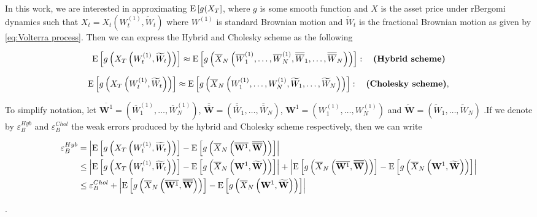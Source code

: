 In this work, we are interested in approximating $\mathrm{E}\left[g(X_T\right]$, where $g$ is some smooth function and $X$ is the asset price under rBergomi dynamics such that $X_t=X_t(W^{(1)}_t,\widetilde{W}_t)$ where $W^{(1)}$ is standard Brownian motion and  $\widetilde{W}_t$ is the fractional Brownian motion as given by \eqref{eq:Volterra process}.  Then we can express the Hybrid and Cholesky scheme as the following 

\begin{align}\label{eq: Hybrid approx}
\mathrm{E}\left[g\left(X_T\left(W^{(1)}_t,\widetilde{W}_t \right)\right)\right] \approx \mathrm{E}\left[g\left(\overline{X}_N\left(\overline{W}^{(1)}_1,\dots,\overline{W}^{(1)}_N, \overline{\overline{W}}_1, \dots,\overline{\overline{W}}_N\right)\right)\right]:\quad \textbf{(Hybrid  scheme)}
\end{align}


\begin{align}\label{eq: Cholesky approx}
\mathrm{E}\left[g\left(X_T\left(W^{(1)}_t,\widetilde{W}_t\right)\right)\right] \approx \mathrm{E}\left[g\left(\overline{X}_N\left(W^{(1)}_1,\dots,W^{(1)}_N, \widetilde{W}_1, \dots,\widetilde{W}_N\right)\right)\right]:\quad \textbf{(Cholesky  scheme)},
\end{align}

To simplify notation, let $\overline{\mathbf{W}^{1}}=(\overline{W}^{(1)}_1,\dots,\overline{W}^{(1)}_N)$, $\overline{\overline{\mathbf{W}}}=(\overline{\overline{W}}_1,\dots,\overline{\overline{W}}_N)$, $\mathbf{W}^{1}=(W^{(1)}_1,\dots,W^{(1)}_N)$ and $\widetilde{\mathbf{W}}=(\widetilde{W}_1,\dots,\widetilde{W}_N)$ .If we denote by $\varepsilon_{B}^{Hyb}$ and $\varepsilon_{B}^{Chol}$ the weak errors produced by the hybrid and Cholesky scheme respectively, then we can write
\begin{small}
\begin{align}\label{eq: Weak_error_hyb_chol}
\varepsilon_{B}^{Hyb}&=\left\lvert\mathrm{E}\left[g\left(X_T\left(W^{(1)}_t,\widetilde{W}_t\right) \right)\right]-\mathrm{E}\left[g\left(\overline{X}_N\left(\overline{\mathbf{W}^{1}}, \overline{\overline{\mathbf{W}}}\right) \right)\right]\right\rvert \nonumber\\
&\le \left\lvert\mathrm{E}\left[g\left(X_T\left(W^{(1)}_t,\widetilde{W}_t\right)\right)\right]-\mathrm{E}\left[g\left(\overline{X}_N\left(\mathbf{W}^{1}, \widetilde{\mathbf{W}}\right)\right)\right]\right\rvert+ \left\lvert \mathrm{E}\left[g\left(\overline{X}_N\left(\overline{\mathbf{W}^{1}}, \overline{\overline{\mathbf{W}}}\right)\right)\right]- \mathrm{E}\left[g\left(\overline{X}_N\left(\mathbf{W}^{1}, \widetilde{\mathbf{W}}\right)\right)\right]\right\rvert\nonumber\\
&\le \varepsilon_{B}^{Chol}+ \left\lvert \mathrm{E}\left[g\left(\overline{X}_N\left(\overline{\mathbf{W}^{1}}, \overline{\overline{\mathbf{W}}}\right)\right)\right]- \mathrm{E}\left[g\left(\overline{X}_N\left(\mathbf{W}^{1}, \widetilde{\mathbf{W}}\right)\right)\right]\right\rvert
\end{align}
\end{small}

.